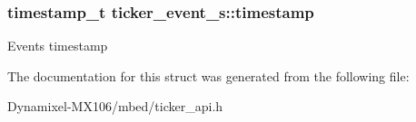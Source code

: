 \subsubsection[{\texorpdfstring{timestamp}{timestamp}}]{\setlength{\rightskip}{0pt plus 5cm}timestamp\+\_\+t ticker\+\_\+event\+\_\+s\+::timestamp}\hypertarget{structticker__event__s_a8266f0174db80330e9dc9c778028c4c3}{}\label{structticker__event__s_a8266f0174db80330e9dc9c778028c4c3}
Event\textquotesingle{}s timestamp 

The documentation for this struct was generated from the following file\+:\begin{DoxyCompactItemize}
\item 
Dynamixel-\/\+M\+X106/mbed/ticker\+\_\+api.\+h\end{DoxyCompactItemize}
